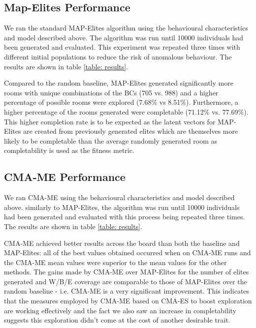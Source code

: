 \documentclass{article}
\begin{document}
\subsection{Map-Elites Performance}

We ran the standard MAP-Elites algorithm using the behavioural characteristics and model described above. The algorithm was run until 10000 individuals had been generated and evaluated. This experiment was repeated three times with different initial populations to reduce the risk of anomalous behaviour. The results are shown in table \ref{table: results}.

Compared to the random baseline, MAP-Elites generated significantly more rooms with unique combinations of the BCs (705 vs. 988) and a higher percentage of possible rooms were explored (7.68\% vs 8.51\%). Furthermore, a higher percentage of the rooms generated were completable (71.12\% vs. 77.69\%). This higher completion rate is to be expected as the latent vectors for MAP-Elites are created from previously generated elites which are themselves more likely to be completable than the average randomly generated room as completability is used as the fitness metric.




\subsection{CMA-ME Performance}

We ran CMA-ME using the behavioural characteristics and model described above. similarly to MAP-Elites, the algorithm was run until 10000 individuals had been generated and evaluated with this process being repeated three times. The results are shown in table \ref{table: results}.

CMA-ME achieved better results across the board than both the baseline and MAP-Elites: all of the best values obtained occurred when on CMA-ME runs and the CMA-ME mean values were superior to the mean values for the other methods. The gains made by CMA-ME over MAP-Elites for the number of elites generated and W/B/E coverage are comparable to those of MAP-Elites over the random baseline - i.e. CMA-ME is a very significant improvement. This indicates that the measures employed by CMA-ME based on CMA-ES to boost exploration are working effectively and the fact we also saw an increase in completability suggests this exploration didn't come at the cost of another desirable trait.
\end{document}
